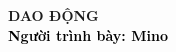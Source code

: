 \begin{frame}[noframenumbering]
    \thispagestyle{empty}
    \bfseries
    \begin{flushleft}
        \vfill
        \vspace{5mm}
        \textcolor{BlueDefault}{\huge \bfseries DAO ĐỘNG} \\
        \vspace{8mm}
        \textcolor{black}{\large \bfseries Người trình bày: Mino }
        \vfill
    \end{flushleft}
\end{frame}
